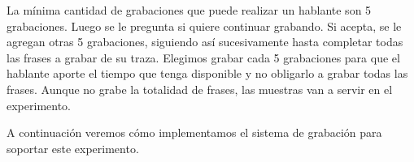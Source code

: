 La mínima cantidad de grabaciones que puede realizar un hablante son 5 grabaciones. Luego se le pregunta si quiere continuar grabando. Si acepta, se le agregan otras 5 grabaciones, siguiendo así sucesivamente hasta completar todas las frases a grabar de su traza. Elegimos grabar cada 5 grabaciones para que el hablante aporte el tiempo que tenga disponible y no obligarlo a grabar todas las frases. Aunque no grabe la totalidad de frases, las muestras van a servir en el experimento.

A continuación veremos cómo implementamos el sistema de grabación para soportar este experimento.
